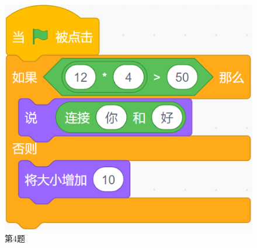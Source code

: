 \documentclass[10pt, a4paper]{article}
\begin{document}
\begin{enumerate}
\begin{figure}[htbp]
\begin{minipage}[t]{.17\textwidth}
                \includegraphics[width=\textwidth]{4.png}
                \caption*{第4题}
            \end{minipage}
            \begin{minipage}[t]{.09\textwidth}
                \centering

\end{minipage}
\end{figure}
\end{enumerate}
\end{document}
